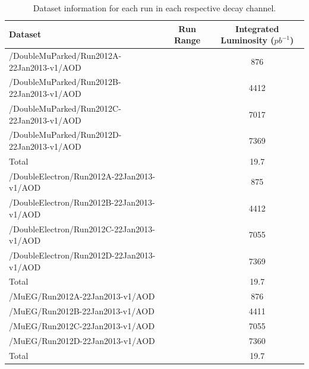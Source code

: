 \begin{table} \label{tab-datasets}
\begin{center}
\begin{tabular}{|l|c|c|}
\hline
	\textbf{Dataset} & \textbf{Run Range} & \textbf{Integrated Luminosity ($pb^{-1}$)}\\
\hline
	/DoubleMuParked/Run2012A-22Jan2013-v1/AOD &  & 876 \\
	/DoubleMuParked/Run2012B-22Jan2013-v1/AOD &  & 4412 \\
	/DoubleMuParked/Run2012C-22Jan2013-v1/AOD &  & 7017 \\
	/DoubleMuParked/Run2012D-22Jan2013-v1/AOD &  & 7369 \\
\hline
	Total & & 19.7\\	
\hline
	/DoubleElectron/Run2012A-22Jan2013-v1/AOD &  & 875 \\
	/DoubleElectron/Run2012B-22Jan2013-v1/AOD &  & 4412 \\
	/DoubleElectron/Run2012C-22Jan2013-v1/AOD &  & 7055 \\
	/DoubleElectron/Run2012D-22Jan2013-v1/AOD &  & 7369 \\
\hline
	Total & & 19.7\\	
\hline
	/MuEG/Run2012A-22Jan2013-v1/AOD &  & 876 \\
	/MuEG/Run2012B-22Jan2013-v1/AOD &  & 4411 \\
	/MuEG/Run2012C-22Jan2013-v1/AOD &  & 7055 \\
	/MuEG/Run2012D-22Jan2013-v1/AOD &  & 7360 \\
\hline
	Total & & 19.7\\	
\hline	
\end{tabular}	
\caption{Dataset information for each run in each respective decay channel.}
\end{center}
\end{table}

